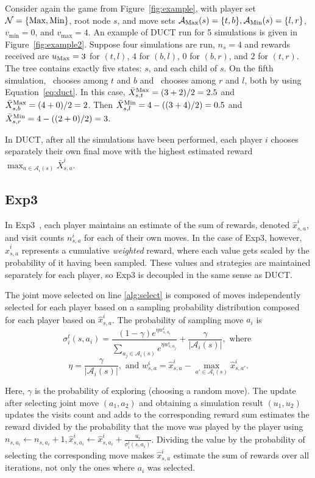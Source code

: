 \documentclass[conference]{IEEEtran}
\newcommand{\cA}{\mathcal{A}}
\newcommand{\cN}{\mathcal{N}}
\begin{document}
Consider again the game from Figure~\ref{fig:example}, with player set $\cN = \{\Max,\Min\}$, root node $s$,
and move sets $\cA_{\Max}(s) = \{t,b\}, \cA_{\Min}(s) = \{l,r\}$, $v_{\min} = 0$, and $v_{\max} = 4$. 
An example of DUCT run for 5 simulations is 
given in Figure~\ref{fig:example2}.
Suppose four simulations are run, $n_s = 4$ and rewards received are $u_{\text{Max}} = 3$ for $(t,l)$, $4$ for $(b,l)$, $0$ for $(b,r)$, 
and $2$ for $(t,r)$. The tree contains exactly five states: $s$, and each child of $s$. On the fifth simulation, 
\Max~chooses among $t$ and $b$ and \Min~chooses among $r$ and $l$, both by using Equation~\ref{eq:duct}. 
In this case, $\bar{X}_{s,t}^{\text{Max}} = (3 + 2) / 2 = 2.5$ and $\bar{X}_{s,b}^{\text{Max}} = (4 + 0) / 2 = 2$. 
Then $\bar{X}_{s,l}^{\text{Min}} = 4 - ((3 + 4) / 2) = 0.5$ and $\bar{X}^{\text{Min}}_{s,r} = 4 - ((2 + 0) / 2) = 3$. 

In DUCT, after all the simulations have been performed, each player $i$ chooses separately their own final move 
with the highest estimated reward $\max_{a \in \cA_i(s)} \bar{X}^i_{s,a}$. 

\subsection{Exp3}

In Exp3~\cite{Exp3}, each player maintains an estimate of the sum of rewards, denoted $\hat{x}^i_{s,a}$, and visit 
counts $n^i_{s,a}$ for each of their own moves. In the case of Exp3, however, $\hat{x}^i_{s,a}$ represents a cumulative 
{\it weighted} reward, where each value gets scaled by the probability of it having been sampled. 
These values and strategies are maintained separately for each player, so Exp3 is decoupled in the same sense as DUCT. 

The joint move selected on line \ref{alg:select} is composed of moves independently selected for each player 
based on a sampling probability distribution composed for each player based on $\hat{x}^i_{s,a}$. 
The probability of sampling move $a_i$ is
\begin{equation}
\label{eq:exp3select}
\sigma^t_i(s,a_i) = \frac{(1-\gamma) e^{\eta w^i_{s,a_i}}}{\sum_{a_j \in \cA_i(s)} e^{\eta w^i_{s,a_j}}} + \frac{\gamma}{|\cA_i(s)|}, \mbox{ where }
\end{equation}
\[ \eta = \frac{\gamma}{|\cA_i(s)|}, \mbox{ and } w^i_{s,a} = \hat{x}^i_{s,a} - \max_{a' \in \cA_i(s)} \hat{x}^i_{s,a'}. \]

\noindent Here, $\gamma$ is the probability of exploring (choosing a random move). 
The update after selecting joint move $(a_1,a_2)$ and obtaining a simulation result $(u_1,u_2)$ updates the visits count 
and adds to the corresponding reward sum estimates the reward divided by the probability that the move was played by the player using
$n_{s,a_i} \leftarrow n_{s,a_i} + 1, \hat{x}^i_{s,a_i} \leftarrow \hat{x}^i_{s,a_i} + \frac{u_i}{\sigma^t_i(s,a_i)}$.
Dividing the value by the probability of selecting the corresponding move makes $\hat{x}^i_{s,a}$ estimate the sum of rewards over all 
iterations, not only the ones where $a_i$ was selected. 
\end{document}

